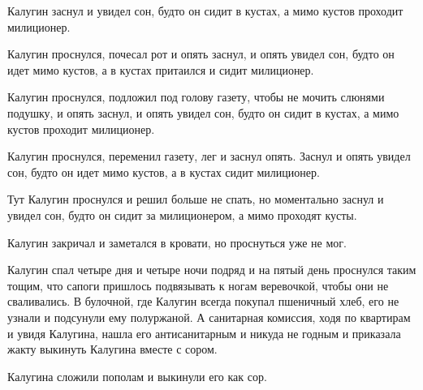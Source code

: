 Калугин  заснул  и увидел сон,  будто он
сидит в кустах, а мимо кустов проходит 
милиционер.

Калугин проснулся,  почесал  рот и опять
заснул, и опять увидел сон,  будто  он  идет
мимо кустов,  а  в  кустах притаился и сидит
милиционер.

Калугин проснулся,  подложил  под голову
газету, чтобы  не мочить слюнями подушку,  и
опять заснул, и опять  увидел сон,  будто он
сидит в кустах, а мимо кустов проходит 
милиционер.

Калугин проснулся, переменил газету, лег
и заснул  опять.  Заснул и опять увидел сон,
будто он идет мимо кустов,  а в кустах сидит
милиционер.

Тут Калугин  проснулся и решил больше не
спать,  но моментально  заснул и увидел сон,
будто он сидит за милиционером,  а мимо 
проходят кусты.

Калугин закричал и заметался  в кровати,
но проснуться уже не мог.

Калугин спал четыре дня  и  четыре  ночи
подряд и на  пятый день  проснулся таким 
тощим, что сапоги пришлось подвязывать к ногам
веревочкой, чтобы они не сваливались. В  
булочной, где Калугин всегда покупал пшеничный
хлеб, его не узнали и подсунули ему 
полуржаной. А санитарная комиссия,  ходя по 
квартирам и увидя Калугина, нашла его 
антисанитарным и никуда не годным и приказала жакту 
выкинуть Калугина вместе с сором.

Калугина сложили пополам и выкинули  его 
как сор.